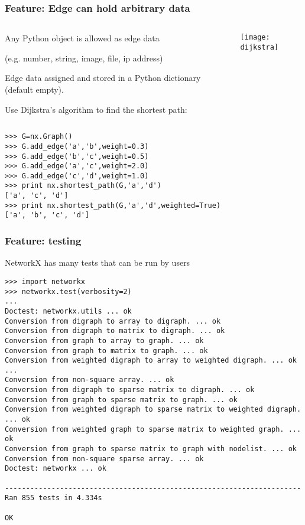 \documentclass[xcolor=dvipsnames, 9pt]{beamer}
\begin{document}
\begin{frame}[fragile]
\frametitle{Feature: Edge can hold arbitrary data}

\begin{columns}[T]

\begin{column}{0.7\textwidth}
Any Python object is allowed as edge data 

(e.g. number, string, image, file, ip address)

Edge data assigned and stored in a Python dictionary (default empty).

\bigskip
Use Dijkstra's algorithm to find the shortest path:

\end{column}

\begin{column}{0.3\textwidth}
\centerline{\texttt{[image: dijkstra]}}
\end{column}
\end{columns}

\begin{block}{}
\begin{verbatim}
>>> G=nx.Graph()
>>> G.add_edge('a','b',weight=0.3)
>>> G.add_edge('b','c',weight=0.5)
>>> G.add_edge('a','c',weight=2.0)
>>> G.add_edge('c','d',weight=1.0)
>>> print nx.shortest_path(G,'a','d')
['a', 'c', 'd']
>>> print nx.shortest_path(G,'a','d',weighted=True)
['a', 'b', 'c', 'd']
\end{verbatim}
\end{block}

\end{frame}



\begin{frame}[fragile]
\frametitle{Feature: testing}
NetworkX has many tests that can be run by users
\footnotesize
\begin{block}{}
\begin{verbatim}
>>> import networkx
>>> networkx.test(verbosity=2)
...
Doctest: networkx.utils ... ok
Conversion from digraph to array to digraph. ... ok
Conversion from digraph to matrix to digraph. ... ok
Conversion from graph to array to graph. ... ok
Conversion from graph to matrix to graph. ... ok
Conversion from weighted digraph to array to weighted digraph. ... ok
...
Conversion from non-square array. ... ok
Conversion from digraph to sparse matrix to digraph. ... ok
Conversion from graph to sparse matrix to graph. ... ok
Conversion from weighted digraph to sparse matrix to weighted digraph. ... ok
Conversion from weighted graph to sparse matrix to weighted graph. ... ok
Conversion from graph to sparse matrix to graph with nodelist. ... ok
Conversion from non-square sparse array. ... ok
Doctest: networkx ... ok

----------------------------------------------------------------------
Ran 855 tests in 4.334s

OK
\end{verbatim}
\end{block}
\end{frame}
\end{document}
